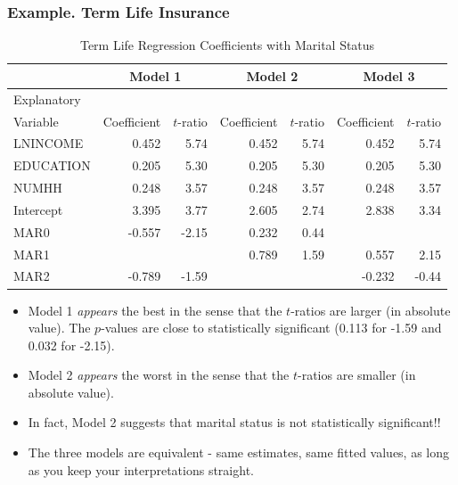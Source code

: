 \begin{frame}[shrink=10]
 \frametitle{Example. Term Life Insurance}
\begin{table}
 \caption{Term Life Regression Coefficients with
Marital Status}
\begin{tabular}{l|rr|rr|rr}
 \hline
 & \multicolumn{2}{c|}{Model 1}& \multicolumn{2}{c|}{Model 2}& \multicolumn{2}{c}{Model 3}\\
 \hline
 Explanatory \\
 Variable & Coefficient & $t$-ratio & Coefficient & $t$-ratio& Coefficient &
 $t$-ratio\\\hline
LNINCOME & 0.452 & 5.74 & 0.452 & 5.74 & 0.452 & 5.74 \\
EDUCATION &0.205 & 5.30 &0.205 & 5.30&0.205 & 5.30 \\
NUMHH     & 0.248 & 3.57 & 0.248 & 3.57 & 0.248 & 3.57 \\\hline
Intercept & 3.395 & 3.77  & 2.605&  2.74 & 2.838 & 3.34\\
MAR0    & -0.557 & -2.15&  0.232 &  0.44\\
MAR1 & & & 0.789 & 1.59 & 0.557 & 2.15\\
MAR2 & -0.789 & -1.59 & & & -0.232 & -0.44\\
\hline
\end{tabular}
\end{table}

  \begin{itemize}
   \item Model 1 \emph{appears} the best in the sense that the $t$-ratios are
   larger (in absolute value). The $p$-values are close to
   statistically significant (0.113 for -1.59 and  0.032
   for -2.15).
\item Model 2 \emph{appears} the worst in the sense that the $t$-ratios are
   smaller (in absolute value).
   \item In fact, Model 2 suggests that marital status is not
   statistically significant!!
      \item The three models are equivalent - same estimates, same
      fitted values, as long as you keep your interpretations
      straight.
      \end{itemize}
\end{frame}




